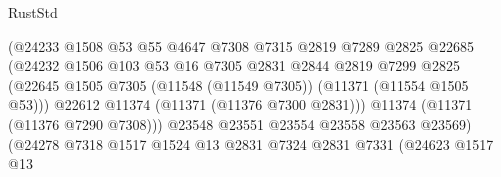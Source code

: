 \begin{lexlean}{RustStd}
\begin{coremodule}
                                          (@24233
                                            @1508
                                            @53
                                            @55
                                            @4647
                                            @7308
                                            @7315
                                            @2819
                                            @7289
                                            @2825
                                            @22685
                                            (@24232
                                              @1506
                                              @103
                                              @53
                                              @16
                                              @7305
                                              @2831
                                              @2844
                                              @2819
                                              @7299
                                              @2825
                                              (@22645
                                                @1505
                                                @7305
                                                (@11548 (@11549 @7305))
                                                (@11371 (@11554 @1505 @53)))
                                              @22612
                                              @11374
                                              (@11371 (@11376 @7300 @2831)))
                                            @11374
                                            (@11371 (@11376 @7290 @7308)))
                                          @23548
                                          @23551
                                          @23554
                                          @23558
                                          @23563
                                          @23569)
                                        (@24278
                                          @7318
                                          @1517
                                          @1524
                                          @13
                                          @2831
                                          @7324
                                          @2831
                                          @7331
                                          (@24623
                                            @1517
                                            @13

\end{coremodule}
\end{lexlean}
